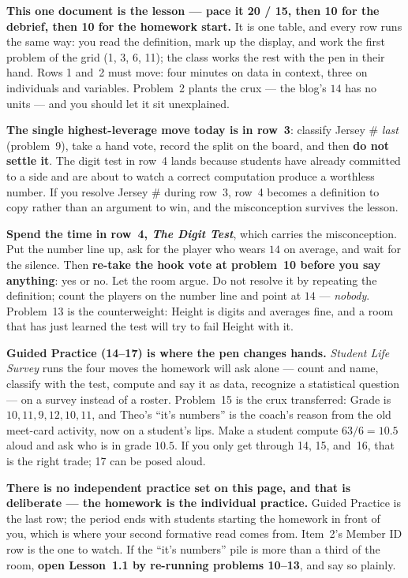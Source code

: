 \documentclass[10pt]{article}
\begin{document}
\begin{teachernote}
\textbf{This one document is the lesson --- pace it 20 / 15, then 10 for the debrief, then 10
for the homework start.} It is one table, and every row runs the same way: you read the
definition, mark up the display, and work the first problem of the grid (1, 3, 6, 11); the
class works the rest with the pen in their hand. Rows 1 and~2 must move: four minutes on data
in context, three on individuals and variables. Problem~2 plants the crux --- the blog's $14$
has no units --- and you should let it sit unexplained.

\textbf{The single highest-leverage move today is in row~3}: classify Jersey \# \emph{last}
(problem~9), take a hand vote, record the split on the board, and then \textbf{do not settle
it}. The digit test in row~4 lands because students have already committed to a side and are
about to watch a correct computation produce a worthless number. If you resolve Jersey \#
during row~3, row~4 becomes a definition to copy rather than an argument to win, and the
misconception survives the lesson.

\textbf{Spend the time in row~4, \emph{The Digit Test}}, which carries the misconception. Put
the number line up, ask for the player who wears $14$ on average, and wait for the silence.
Then \textbf{re-take the hook vote at problem~10 before you say anything}: yes or no. Let the
room argue. Do not resolve it by repeating the definition; count the players on the number
line and point at $14$ --- \emph{nobody}. Problem~13 is the counterweight: Height is digits
and averages fine, and a room that has just learned the test will try to fail Height with it.

\textbf{Guided Practice (14--17) is where the pen changes hands.} \emph{Student Life Survey}
runs the four moves the homework will ask alone --- count and name, classify with the test,
compute and say it as data, recognize a statistical question --- on a survey instead of a
roster. Problem~15 is the crux transferred: Grade is $10, 11, 9, 12, 10, 11$, and Theo's
``it's numbers'' is the coach's reason from the old meet-card activity, now on a student's
lips. Make a student compute $63/6 = 10.5$ aloud and ask who is in grade $10.5$. If you only
get through 14, 15, and~16, that is the right trade; 17 can be posed aloud.

\textbf{There is no independent practice set on this page, and that is deliberate --- the
homework is the individual practice.} Guided Practice is the last row; the period ends with
students starting the homework in front of you, which is where your second formative read
comes from. Item~2's Member ID row is the one to watch. If the ``it's numbers'' pile is more
than a third of the room, \textbf{open Lesson~1.1 by re-running problems 10--13}, and say so
plainly.


\end{teachernote}
\end{document}
